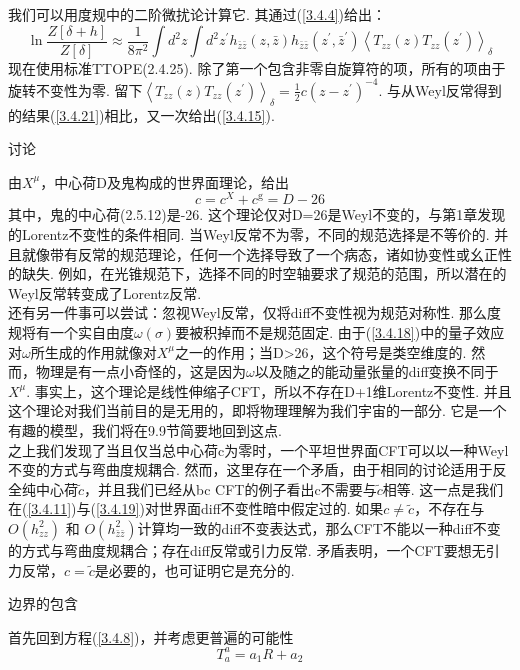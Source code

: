 我们可以用度规中的二阶微扰论计算它. 其通过(\ref{3.4.4})给出：
\begin{equation}
\ln \frac{Z[\delta+h]}{Z[\delta]} \approx \frac{1}{8 \pi^{2}} \int d^{2} z \int d^{2} z^{\prime} h_{\bar{z} \bar{z}}(z, \bar{z}) h_{\bar{z} \bar{z}}\left(z^{\prime}, \bar{z}^{\prime}\right)\left\langle T_{z z}(z) T_{z z}\left(z^{\prime}\right)\right\rangle_{\delta}
\end{equation}
现在使用标准TTOPE(2.4.25). 除了第一个包含非零自旋算符的项，所有的项由于旋转不变性为零. 留下$\left\langle T_{z z}(z) T_{z z}\left(z^{\prime}\right)\right\rangle_{\delta}=\frac{1}{2} c\left(z-z^{\prime}\right)^{-4}$.
与从Weyl反常得到的结果(\ref{3.4.21})相比，又一次给出(\ref{3.4.15}).

\centerline{\Large 讨论}
由$X^\mu$，中心荷D及鬼构成的世界面理论，给出
\begin{equation}
c=c^{X}+c^{\mathrm{g}}=D-26
\end{equation}
其中，鬼的中心荷(2.5.12)是-26. 这个理论仅对D=26是Weyl不变的，与第1章发现的Lorentz不变性的条件相同. 当Weyl反常不为零，不同的规范选择是不等价的. 并且就像带有反常的规范理论，任何一个选择导致了一个病态，诸如协变性或幺正性的缺失. 例如，在光锥规范下，选择不同的时空轴要求了规范的范围，所以潜在的Weyl反常转变成了Lorentz反常.\\
还有另一件事可以尝试：忽视Weyl反常，仅将diff不变性视为规范对称性. 那么度规将有一个实自由度$\omega(\sigma)$要被积掉而不是规范固定. 由于(\ref{3.4.18})中的量子效应对$\omega$所生成的作用就像对$X^\mu$之一的作用；当D>26，这个符号是类空维度的. 然而，物理是有一点小奇怪的，这是因为$\omega$以及随之的能动量张量的diff变换不同于$X^\mu$. 事实上，这个理论是线性伸缩子CFT，所以不存在D+1维Lorentz不变性. 并且这个理论对我们当前目的是无用的，即将物理理解为我们宇宙的一部分. 它是一个有趣的模型，我们将在9.9节简要地回到这点.\\
之上我们发现了当且仅当总中心荷c为零时，一个平坦世界面CFT可以以一种Weyl不变的方式与弯曲度规耦合. 然而，这里存在一个矛盾，由于相同的讨论适用于反全纯中心荷$\tilde{c}$，并且我们已经从bc CFT的例子看出c不需要与$\tilde{c}$相等. 这一点是我们在(\ref{3.4.11})与(\ref{3.4.19})对世界面diff不变性暗中假定过的. 如果$c\neq \tilde{c}$，不存在与$O\left(h_{z z}^{2}\right)$ 和 $O\left(h_{\bar{z} \bar{z}}^{2}\right)$计算均一致的diff不变表达式，那么CFT不能以一种diff不变的方式与弯曲度规耦合；存在diff反常或引力反常. 矛盾表明，一个CFT要想无引力反常，$c= \tilde{c}$是必要的，也可证明它是充分的.

\centerline{\Large 边界的包含}
首先回到方程(\ref{3.4.8})，并考虑更普遍的可能性
\begin{equation}\label{3.4.24}
	T_{a}^{a}=a_{1} R+a_{2}
\end{equation}

